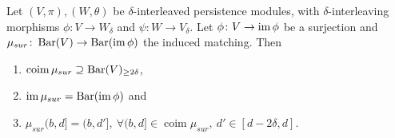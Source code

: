 \begin{lemma} \cite[Lemma 3.2.1]{polterovich} \label{lemma:sur-image}
    Let $ (V, \pi), (W, \theta) $ be $\delta$-interleaved persistence modules, with $\delta$-inter\-leaving morphisms $ \phi\colon V \to W_\delta $ and $ \psi\colon W \to V_\delta $. Let $ \phi\colon V \to \operatorname{im}\phi $ be a surjection and $ \mu_{sur}\colon \operatorname{Bar}(V) \to \operatorname{Bar} (\operatorname{im} \phi)$ the induced matching. Then
    \begin{enumerate}
        \item $\operatorname{coim} \mu_{sur} \supseteq \operatorname{Bar} (V)_{\geq 2\delta} $,
        \item $ \operatorname{im} \mu_{sur} = \operatorname{Bar} (\operatorname{im} \phi)$ and \label{}
        \item $ \mu_{sur}(b, d] = (b, d'], \ \forall (b, d] \in \operatorname{coim} \mu_{sur}, \ d' \in [d-2\delta, d]$.
    \end{enumerate}
\end{lemma}

